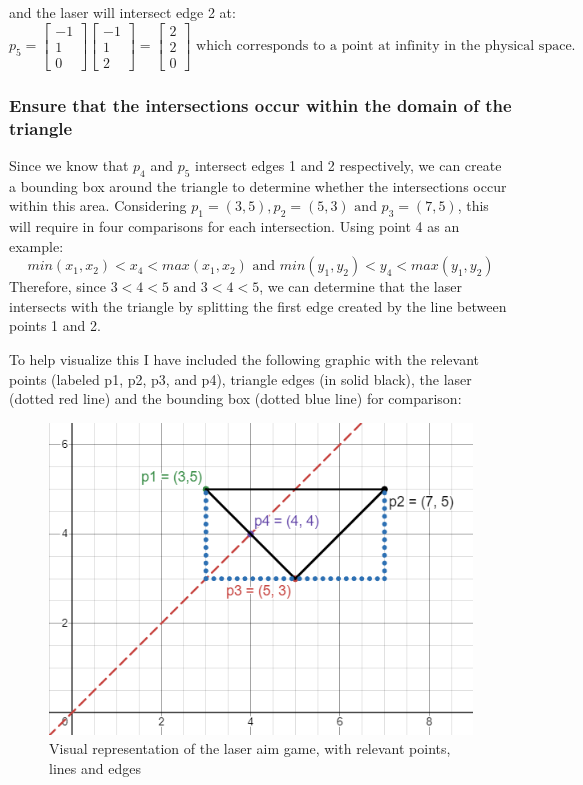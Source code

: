 \documentclass{article}
\begin{document}
and the laser will intersect edge 2 at:
\[p_5 = \begin{bmatrix}
    -1 \\ 1 \\ 0
\end{bmatrix} \begin{bmatrix}
    -1 \\ 1 \\ 2
\end{bmatrix} = \begin{bmatrix}
    2 \\ 2 \\ 0
\end{bmatrix} \text{ which corresponds to a point at infinity in the physical space.}\]

\subsubsection*{Ensure that the intersections occur within the domain of the triangle}
Since we know that \(p_4\) and \(p_5\) intersect edges 1 and 2 respectively, we can create a bounding box around the triangle to determine whether the intersections occur within this area. Considering \(p_1 = (3, 5), p_2 = (5, 3) \text{ and } p_3 = (7, 5)\), this will require in four comparisons for each intersection. Using point 4 as an example:
\[min(x_1, x_2) < x_4 < max(x_1, x_2) \text{ and } min(y_1, y_2) < y_4 < max(y_1, y_2)\]
Therefore, since \(3 < 4 < 5 \text{ and } 3 < 4 < 5\), we can determine that the laser intersects with the triangle by splitting the first edge created by the line between points 1 and 2. 

To help visualize this I have included the following graphic with the relevant points (labeled p1, p2, p3, and p4), triangle edges (in solid black), the laser (dotted red line) and the bounding box (dotted blue line) for comparison:
\begin{figure}[H]
    \centering
    \includegraphics[width=0.5\linewidth]{q7_graph.png}
    \caption{Visual representation of the laser aim game, with relevant points, lines and edges}
    \label{fig:enter-label}
\end{figure}
\end{document}
